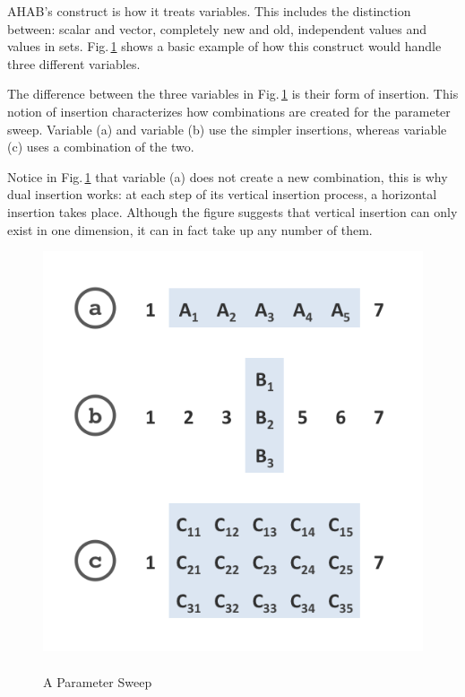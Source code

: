 AHAB's construct is how it treats variables.  This includes the distinction between: scalar and vector, completely new and old, independent values and values in sets.  Fig.\,\ref{fig:ahabInsert} shows a basic example of how this construct would handle three different variables.

The difference between the three variables in Fig.\,\ref{fig:ahabInsert} is their form of insertion.  This notion of insertion characterizes how combinations are created for the parameter sweep.  Variable (a) and variable (b) use the simpler insertions, whereas variable (c) uses a combination of the two.  

Notice in Fig.\,\ref{fig:ahabInsert} that variable (a) does not create a new combination, this is why dual insertion works: at each step of its vertical insertion process, a horizontal insertion takes place. Although the figure suggests that vertical insertion can only exist in one dimension, it can in fact take up any number of them.

\begin{figure}	
	\centering
	\includegraphics[width=.7\textwidth]{graphics/ahabInsert.png}
	\caption[A Vector Parameter Sweep]{ \\ A Parameter Sweep \\  }
	\label{fig:ahabInsert}
\end{figure}

